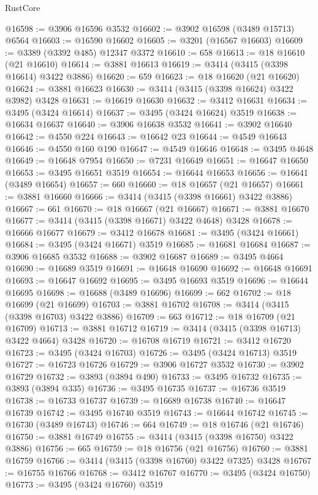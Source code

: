\begin{lexlean}{RustCore}
\begin{coremodule}
@16598 := @3906 @16596 @3532
@16602 := @3902 @16598 (@3489 @15713) @6564
@16603 := @16590 @16602
@16605 := @3201 (@16567 @16603)
@16609 := @3389 (@3392 @485) @12347 @3372
@16610 := 658
@16613 := @18 @16610 (@21 @16610)
@16614 := @3881 @16613
@16619 := @3414 (@3415 (@3398 @16614) @3422 @3886)
@16620 := 659
@16623 := @18 @16620 (@21 @16620)
@16624 := @3881 @16623
@16630 := @3414 (@3415 (@3398 @16624) @3422 @3982) @3428
@16631 := @16619 @16630
@16632 := @3412 @16631
@16634 := @3495 (@3424 @16614)
@16637 := @3495 (@3424 @16624) @3519
@16638 := @16634 @16637
@16640 := @3906 @16638 @3532
@16641 := @3902 @16640
@16642 := @4550 @224
@16643 := @16642 @23
@16644 := @4549 @16643
@16646 := @4550 @160 @190
@16647 := @4549 @16646
@16648 := @3495 @4648
@16649 := @16648 @7954
@16650 := @7231 @16649
@16651 := @16647 @16650
@16653 := @3495 @16651 @3519
@16654 := @16644 @16653
@16656 := @16641 (@3489 @16654)
@16657 := 660
@16660 := @18 @16657 (@21 @16657)
@16661 := @3881 @16660
@16666 := @3414 (@3415 (@3398 @16661) @3422 @3886)
@16667 := 661
@16670 := @18 @16667 (@21 @16667)
@16671 := @3881 @16670
@16677 := @3414 (@3415 (@3398 @16671) @3422 @4648) @3428
@16678 := @16666 @16677
@16679 := @3412 @16678
@16681 := @3495 (@3424 @16661)
@16684 := @3495 (@3424 @16671) @3519
@16685 := @16681 @16684
@16687 := @3906 @16685 @3532
@16688 := @3902 @16687
@16689 := @3495 @4664
@16690 := @16689 @3519
@16691 := @16648 @16690
@16692 := @16648 @16691
@16693 := @16647 @16692
@16695 := @3495 @16693 @3519
@16696 := @16644 @16695
@16698 := @16688 (@3489 @16696)
@16699 := 662
@16702 := @18 @16699 (@21 @16699)
@16703 := @3881 @16702
@16708 := @3414 (@3415 (@3398 @16703) @3422 @3886)
@16709 := 663
@16712 := @18 @16709 (@21 @16709)
@16713 := @3881 @16712
@16719 := @3414 (@3415 (@3398 @16713) @3422 @4664) @3428
@16720 := @16708 @16719
@16721 := @3412 @16720
@16723 := @3495 (@3424 @16703)
@16726 := @3495 (@3424 @16713) @3519
@16727 := @16723 @16726
@16729 := @3906 @16727 @3532
@16730 := @3902 @16729
@16732 := @3893 (@3894 @490)
@16733 := @3495 @16732
@16735 := @3893 (@3894 @335)
@16736 := @3495 @16735
@16737 := @16736 @3519
@16738 := @16733 @16737
@16739 := @16689 @16738
@16740 := @16647 @16739
@16742 := @3495 @16740 @3519
@16743 := @16644 @16742
@16745 := @16730 (@3489 @16743)
@16746 := 664
@16749 := @18 @16746 (@21 @16746)
@16750 := @3881 @16749
@16755 := @3414 (@3415 (@3398 @16750) @3422 @3886)
@16756 := 665
@16759 := @18 @16756 (@21 @16756)
@16760 := @3881 @16759
@16766 := @3414 (@3415 (@3398 @16760) @3422 @7325) @3428
@16767 := @16755 @16766
@16768 := @3412 @16767
@16770 := @3495 (@3424 @16750)
@16773 := @3495 (@3424 @16760) @3519

\end{coremodule}
\end{lexlean}
